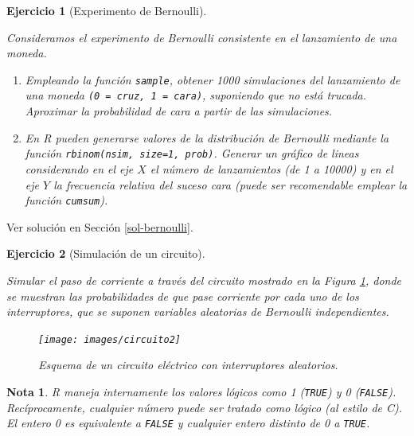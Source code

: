 \documentclass[
  10pt,
]{book}
\theoremstyle{break}
\newtheorem{exercise}{Ejercicio}[chapter]
\theoremstyle{nonumberplain}
\newtheorem{remark}{Nota}
\begin{document}
\begin{exercise}[Experimento de Bernoulli]
\protect\hypertarget{exr:bernoulli}{}\label{exr:bernoulli}

Consideramos el experimento de Bernoulli consistente en el
lanzamiento de una moneda.

\begin{enumerate}
\def\labelenumi{\alph{enumi})}
\item
  Empleando la función \texttt{sample}, obtener 1000 simulaciones del
  lanzamiento de una moneda \texttt{(0\ =\ cruz,\ 1\ =\ cara)}, suponiendo que
  no está trucada. Aproximar la probabilidad de cara a partir de
  las simulaciones.
\item
  En R pueden generarse valores de la distribución de Bernoulli
  mediante la función \texttt{rbinom(nsim,\ size=1,\ prob)}. Generar un
  gráfico de lineas considerando en el eje \(X\) el número de
  lanzamientos (de 1 a 10000) y en el eje \(Y\) la frecuencia
  relativa del suceso cara (puede ser recomendable emplear la
  función \texttt{cumsum}).
\end{enumerate}

\end{exercise}

Ver solución en Sección \ref{sol-bernoulli}.

\begin{exercise}[Simulación de un circuito]
\protect\hypertarget{exr:circuito}{}\label{exr:circuito}

Simular el paso de corriente a través del circuito mostrado en la Figura \ref{fig:circuito2}, donde se muestran las probabilidades de que pase corriente por cada uno de los interruptores, que se suponen variables aleatorias de Bernoulli independientes.

\begin{figure}[!htbp]

{\centering \texttt{[image: images/circuito2]} 

}

\caption{Esquema de un circuito eléctrico con interruptores aleatorios.}\label{fig:circuito2}
\end{figure}

\end{exercise}

\begin{remark}
R maneja internamente los valores lógicos como 1 (\texttt{TRUE}) y 0 (\texttt{FALSE}).
Recíprocamente, cualquier número puede ser tratado como lógico (al estilo de C).
El entero 0 es equivalente a \texttt{FALSE} y cualquier entero distinto de 0 a \texttt{TRUE}.
\end{remark}
\end{document}
